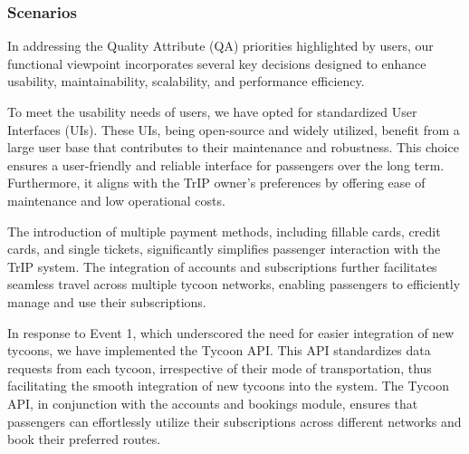 \begin{table}[h!]
    \centering
    \caption{Functional View Prioritized Quality Attributes}
    \label{tab:functional_view}
  \end{table}


\subsubsection{Scenarios}


In addressing the Quality Attribute (QA) priorities highlighted by users, our functional viewpoint incorporates several key decisions designed to enhance usability, maintainability, scalability, and performance efficiency.

To meet the usability needs of users, we have opted for standardized User Interfaces (UIs). These UIs, being open-source and widely utilized, benefit from a large user base that contributes to their maintenance and robustness. This choice ensures a user-friendly and reliable interface for passengers over the long term. Furthermore, it aligns with the TrIP owner's preferences by offering ease of maintenance and low operational costs.

The introduction of multiple payment methods, including fillable cards, credit cards, and single tickets, significantly simplifies passenger interaction with the TrIP system. The integration of accounts and subscriptions further facilitates seamless travel across multiple tycoon networks, enabling passengers to efficiently manage and use their subscriptions.

In response to Event 1, which underscored the need for easier integration of new tycoons, we have implemented the Tycoon API. This API standardizes data requests from each tycoon, irrespective of their mode of transportation, thus facilitating the smooth integration of new tycoons into the system. The Tycoon API, in conjunction with the accounts and bookings module, ensures that passengers can effortlessly utilize their subscriptions across different networks and book their preferred routes.

